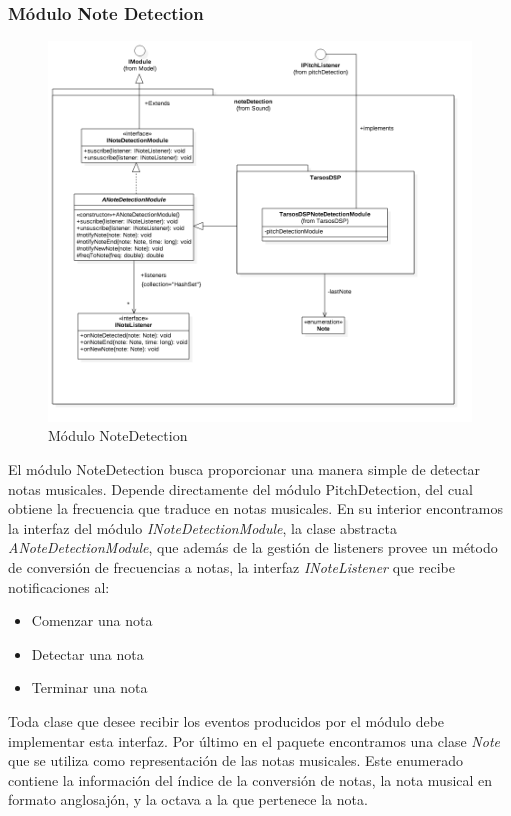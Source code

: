 \subsubsection{Módulo Note Detection}
\begin{figure}
	\centering
	\includegraphics[width=1\linewidth]{imagenes/diagramas/NoteDetectionModule.png}
	\caption{Módulo NoteDetection}
	\label{fig:note-detection-module}
\end{figure}
El módulo NoteDetection busca proporcionar una manera simple de detectar notas musicales. Depende directamente del módulo PitchDetection, del cual obtiene la frecuencia que traduce en notas musicales.
En su interior encontramos la interfaz del módulo \textit{INoteDetectionModule}, la clase abstracta \textit{ANoteDetectionModule}, que además de la gestión de listeners provee un método de conversión de frecuencias a notas, la interfaz \textit{INoteListener} que recibe notificaciones al:
\begin{itemize}
	\item Comenzar una nota
	\item Detectar una nota
	\item Terminar una nota
\end{itemize}
 Toda clase que desee recibir los eventos producidos por el módulo debe implementar esta interfaz.
 Por último en el paquete encontramos una clase \textit{Note} que se utiliza como representación de las notas musicales. Este enumerado contiene la información del índice de la conversión de notas, la nota musical en formato anglosajón, y la octava a la que pertenece la nota.
 
